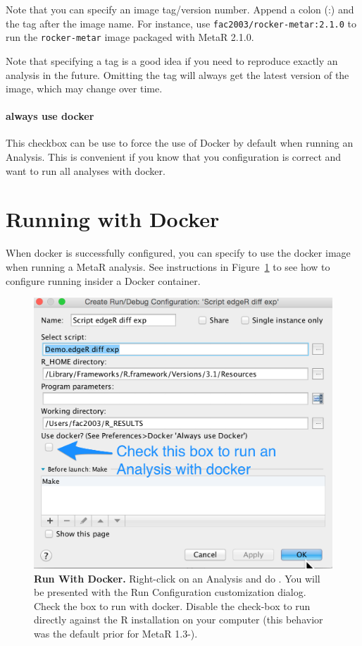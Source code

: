 \begin{remark}
Note that you can specify an image tag/version number. Append a colon (:) and the tag after the image name. For instance, use \texttt{fac2003/rocker-metar:2.1.0} to run the \texttt{rocker-metar} image packaged with MetaR 2.1.0.  
\end{remark}

\begin{remark}
Note that specifying a tag is a good idea if you need to reproduce exactly an analysis in the future. Omitting the tag will always get the latest version of the image, which may change over time.  
\end{remark}

\paragraph{always use docker}
This checkbox can be use to force the use of Docker by default when running an Analysis. This is convenient if you know that you configuration is correct and want to run all analyses with docker. 

\section{Running with Docker}
When docker is successfully configured, you can specify to use the docker image when running a MetaR analysis. See instructions in Figure~\ref{fig:RunWithDocker} to see how to configure running insider a Docker container.

\begin{figure}
  \centering
  \includegraphics[width=\figWidthNarrow]{figures/CheckThisBoxToRunWithDocker.png}
\caption[Run With Docker.]{\textbf{Run With Docker.} Right-click on an Analysis and do . You will be presented with the Run Configuration customization dialog. Check the box to run with docker. Disable the check-box to run directly against the R installation on your computer (this behavior was the default prior for MetaR 1.3-).  }
\label{fig:RunWithDocker}
\end{figure}


